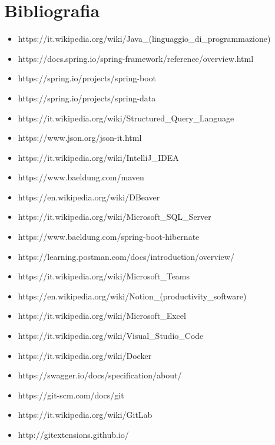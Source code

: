 \cleardoublepage
\chapter{Bibliografia}

\nocite{*}

\printbibliography[heading=subbibliography,title={Riferimenti bibliografici},type=book]

\printbibliography[heading=subbibliography,title={Siti web consultati},type=online]

\begin{itemize}
\item https://it.wikipedia.org/wiki/Java\_(linguaggio\_di\_programmazione)
\item https://docs.spring.io/spring-framework/reference/overview.html
\item https://spring.io/projects/spring-boot
\item https://spring.io/projects/spring-data
\item https://it.wikipedia.org/wiki/Structured\_Query\_Language
\item https://www.json.org/json-it.html
\item https://it.wikipedia.org/wiki/IntelliJ\_IDEA
\item https://www.baeldung.com/maven
\item https://en.wikipedia.org/wiki/DBeaver
\item https://it.wikipedia.org/wiki/Microsoft\_SQL\_Server
\item https://www.baeldung.com/spring-boot-hibernate
\item https://learning.postman.com/docs/introduction/overview/
\item https://it.wikipedia.org/wiki/Microsoft\_Teams
\item https://en.wikipedia.org/wiki/Notion\_(productivity\_software)
\item https://it.wikipedia.org/wiki/Microsoft\_Excel
\item https://it.wikipedia.org/wiki/Visual\_Studio\_Code
\item https://it.wikipedia.org/wiki/Docker
\item https://swagger.io/docs/specification/about/
\item https://git-scm.com/docs/git
\item https://it.wikipedia.org/wiki/GitLab
\item http://gitextensions.github.io/

\end{itemize}